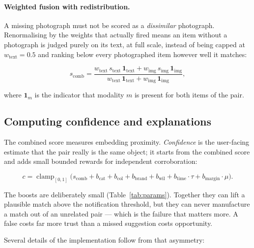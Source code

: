 \paragraph{Weighted fusion with redistribution.} A missing photograph must not be
scored as a \emph{dissimilar} photograph. Renormalising by the weights that
actually fired means an item without a photograph is judged purely on its text,
at full scale, instead of being capped at $w_{\text{text}} = 0.5$ and ranking
below every photographed item however well it matches:

\begin{equation}
s_{\text{comb}} =
\frac{w_{\text{text}}\, s_{\text{text}}\, \mathbf{1}_{\text{text}}
    + w_{\text{img}}\, s_{\text{img}}\, \mathbf{1}_{\text{img}}}
     {w_{\text{text}}\, \mathbf{1}_{\text{text}}
    + w_{\text{img}}\, \mathbf{1}_{\text{img}}} ,
\label{eq:fusion}
\end{equation}

\noindent where $\mathbf{1}_{m}$ is the indicator that modality $m$ is present
for both items of the pair.

\subsection{Computing confidence and explanations}

The combined score measures embedding proximity. \emph{Confidence} is the
user-facing estimate that the pair really is the same object; it starts from the
combined score and adds small bounded rewards for independent corroboration:

\begin{equation}
c = \operatorname{clamp}_{[0,1]}\!\Big(s_{\text{comb}}
  + b_{\text{cat}} + b_{\text{col}} + b_{\text{brand}} + b_{\text{wil}}
  + b_{\text{time}} \cdot \tau + b_{\text{margin}} \cdot \mu \Big).
\label{eq:confidence}
\end{equation}

The boosts are deliberately small (Table~\ref{tab:params}). Together they can
lift a plausible match above the notification threshold, but they can never
manufacture a match out of an unrelated pair --- which is the failure that
matters more. A false  costs far more trust than a
missed suggestion costs opportunity.

Several details of the implementation follow from that asymmetry:

